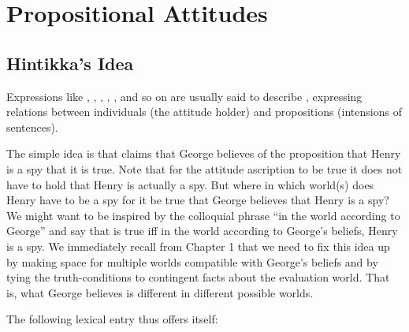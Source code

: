 \chapter{Propositional Attitudes}\label{cha:propositional_attitudes} %


\minitoc

\section{Hintikka's Idea} \label{sec:hintikkas-idea}

Expressions %
%
like , , ,
, , and so on are usually said
to describe , expressing relations
between individuals (the attitude holder) and propositions (intensions
of sentences).

The simple idea is that  claims that George believes of the proposition that Henry is a
spy that it is true. %
%
Note that for the attitude ascription to be true it does not have to
hold that Henry is actually a spy. But where \dash in which world(s)
\dash does Henry have to be a spy for it be true that George believes
that Henry is a spy? We might want to be inspired by the colloquial
phrase ``in the world according to George'' and say that
 is true iff in the
world according to George's beliefs, Henry is a spy. We immediately
recall from Chapter 1 that we need to fix this idea up by
making space for multiple worlds compatible with George's beliefs and
by tying the truth-conditions to contingent facts about the evaluation
world. That is, what George believes is different in different
possible worlds.

\clearpage The following lexical entry thus offers itself:

